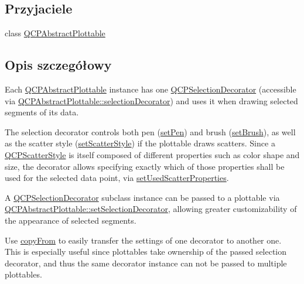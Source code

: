 \subsection*{Przyjaciele}
\begin{DoxyCompactItemize}
\item 
class \hyperlink{class_q_c_p_selection_decorator_a53cf0e76aca814550c796fed79e345d6}{Q\+C\+P\+Abstract\+Plottable}
\end{DoxyCompactItemize}


\subsection{Opis szczegółowy}
Each \hyperlink{class_q_c_p_abstract_plottable}{Q\+C\+P\+Abstract\+Plottable} instance has one \hyperlink{class_q_c_p_selection_decorator}{Q\+C\+P\+Selection\+Decorator} (accessible via \hyperlink{class_q_c_p_abstract_plottable_a33e6f2b8d6008e4ac59ff8d92b509c97}{Q\+C\+P\+Abstract\+Plottable\+::selection\+Decorator}) and uses it when drawing selected segments of its data.

The selection decorator controls both pen (\hyperlink{class_q_c_p_selection_decorator_ac2c8192e1e294aa3a4a7f32a859e3d76}{set\+Pen}) and brush (\hyperlink{class_q_c_p_selection_decorator_aa74b626be518ea17055f918d423c8c2d}{set\+Brush}), as well as the scatter style (\hyperlink{class_q_c_p_selection_decorator_ab403a613289714ff4fd4a0c0371ab116}{set\+Scatter\+Style}) if the plottable draws scatters. Since a \hyperlink{class_q_c_p_scatter_style}{Q\+C\+P\+Scatter\+Style} is itself composed of different properties such as color shape and size, the decorator allows specifying exactly which of those properties shall be used for the selected data point, via \hyperlink{class_q_c_p_selection_decorator_a808c1607cd4e83869c04986e332455c0}{set\+Used\+Scatter\+Properties}.

A \hyperlink{class_q_c_p_selection_decorator}{Q\+C\+P\+Selection\+Decorator} subclass instance can be passed to a plottable via \hyperlink{class_q_c_p_abstract_plottable_a20e266ad646f8c4a7e4631040510e5d9}{Q\+C\+P\+Abstract\+Plottable\+::set\+Selection\+Decorator}, allowing greater customizability of the appearance of selected segments.

Use \hyperlink{class_q_c_p_selection_decorator_a467a8d5cfcab27e862a17c797ac27b8a}{copy\+From} to easily transfer the settings of one decorator to another one. This is especially useful since plottables take ownership of the passed selection decorator, and thus the same decorator instance can not be passed to multiple plottables.

